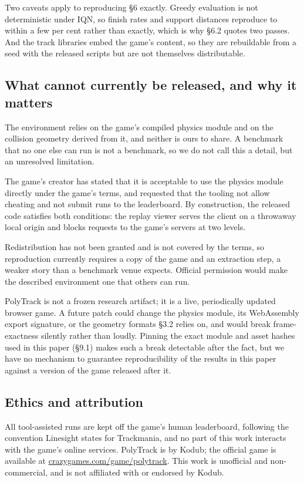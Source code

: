 \documentclass[11pt]{article}
\begin{document}
Two caveats apply to reproducing \S6 exactly. Greedy evaluation is not deterministic under IQN, so finish rates and support distances reproduce to within a few per cent rather than exactly, which is why \S6.2 quotes two passes. And the track libraries embed the game's content, so they are rebuildable from a seed with the released scripts but are not themselves distributable.

\subsection{What cannot currently be released, and why it matters}

The environment relies on the game's compiled physics module and on the collision geometry derived from it, and neither is ours to share. A benchmark that no one else can run is not a benchmark, so we do not call this a detail, but an unresolved limitation.

The game's creator has stated that it is acceptable to use the physics module directly under the game's terms, and requested that the tooling not allow cheating and not submit runs to the leaderboard. By construction, the released code satisfies both conditions: the replay viewer serves the client on a throwaway local origin and blocks requests to the game's servers at two levels.

Redistribution has not been granted and is not covered by the terms, so reproduction currently requires a copy of the game and an extraction step, a weaker story than a benchmark venue expects. Official permission would make the described environment one that others can run.

PolyTrack is not a frozen research artifact; it is a live, periodically updated browser game. A future patch could change the physics module, its WebAssembly export signature, or the geometry formats \S3.2 relies on, and would break frame-exactness silently rather than loudly. Pinning the exact module and asset hashes used in this paper (\S9.1) makes such a break detectable after the fact, but we have no mechanism to guarantee reproducibility of the results in this paper against a version of the game released after it.

\subsection{Ethics and attribution}

All tool-assisted runs are kept off the game's human leaderboard, following the convention Linesight states for Trackmania, and no part of this work interacts with the game's online services. PolyTrack is by Kodub; the official game is available at \url{crazygames.com/game/polytrack}. This work is unofficial and non-commercial, and is not affiliated with or endorsed by Kodub.
\end{document}
